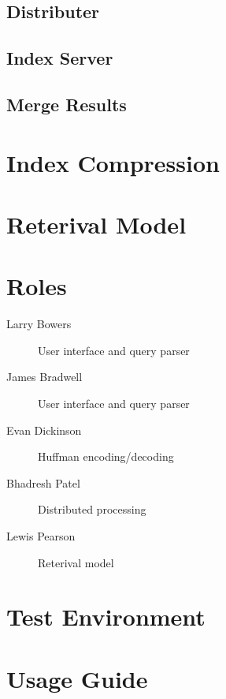 \documentclass[letterpaper,11pt,twoside]{article}
\begin{document}
\subsection{Distributer}

\subsection{Index Server}

\subsection{Merge Results}

\section{Index Compression}


\section{Reterival Model}


\section{Roles}
\begin{description}
  \item[Larry Bowers] User interface and query parser
  \item[James Bradwell] User interface and query parser
  \item[Evan Dickinson] Huffman encoding/decoding 
  \item[Bhadresh Patel] Distributed processing
  \item[Lewis Pearson] Reterival model
\end{description}

\section{Test Environment}


\section{Usage Guide}
\end{document}
